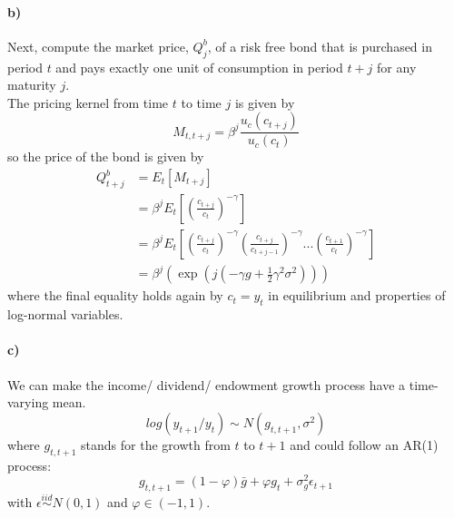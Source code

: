 \documentclass[12pt,letter]{article}
\begin{document}
\paragraph{b)} Next, compute the market price, $Q_j^b$, of a risk free bond that is purchased in period $t$ and pays exactly one unit of consumption in period $t+j$ for any maturity $j$. \\

The pricing kernel from time $t$ to time $j$ is given by 
\begin{equation*}
	M_{t, t+j} = \beta^j\frac{u_c(c_{t+j})}{u_c(c_t)}
\end{equation*}
so the price of the bond is given by 
\begin{equation*}
\begin{split}
	Q^b_{t+j} &= E_t\left[M_{t+j}\right]\\
	&= \beta^j E_t\left[\left(\frac{c_{t+j}}{c_t}\right)^{-\gamma}\right]\\
	&= \beta^j E_t\left[\left(\frac{c_{t+j}}{c_t}\right)^{-\gamma}\left(\frac{c_{t+j}}{c_{t+j-1}}\right)^{-\gamma}...\left(\frac{c_{t+1}}{c_{t}}\right)^{-\gamma}\right]\\
	&= \beta^j\left(\exp\left(j(-\gamma g + \frac{1}{2}\gamma^2 \sigma^2)\right)\right)
\end{split}
\end{equation*}
where the final equality holds again by $c_t = y_t$ in equilibrium and properties of log-normal variables. 
\paragraph{c)}
We can make the income/ dividend/ endowment growth process have a time-varying mean.
\begin{equation*}
log(y_{t+1}/y_t) \sim N(g_{t,t+1},\sigma^2)
\end{equation*}
where $g_{t,t+1}$ stands for the growth from $t$ to $t+1$ and could follow an AR(1) process:
\begin{equation}\label{ARprocess}
g_{t,t+1} = (1-\varphi)\bar{g}+\varphi g_t + \sigma_g^2 \epsilon_{t+1}
\end{equation}
with $\epsilon \stackrel{iid}{\sim} N(0,1)$ and $\varphi \in (-1,1)$.
\end{document}
